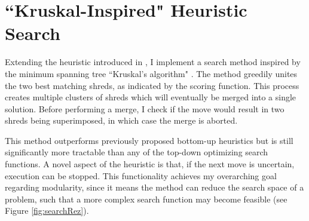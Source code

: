 \documentclass[letterpaper]{article}
\begin{document}
\section{
\fontsize{12pt}{15pt} 
\selectfont
``Kruskal-Inspired" Heuristic Search}
\fontsize{10pt}{12pt} 
\selectfont
Extending the heuristic introduced in \cite{P5}, I implement a search method inspired by the minimum spanning tree ``Kruskal's algorithm" \cite{P13}. The method greedily unites the two best matching shreds, as indicated by the scoring function. This process creates multiple clusters of shreds which will eventually be merged into a single solution. Before performing a merge, I check if the move would result in two shreds being superimposed, in which case the merge is aborted.

This method outperforms previously proposed bottom-up heuristics but is still significantly more tractable than any of the top-down optimizing search functions. A novel aspect of the heuristic is that, if the next move is uncertain, execution can be stopped. This functionality achieves my overarching goal regarding modularity, since it means the method can reduce the search space of a problem, such that a more complex search function may become feasible (see Figure \ref{fig:searchRez}).
\end{document}
